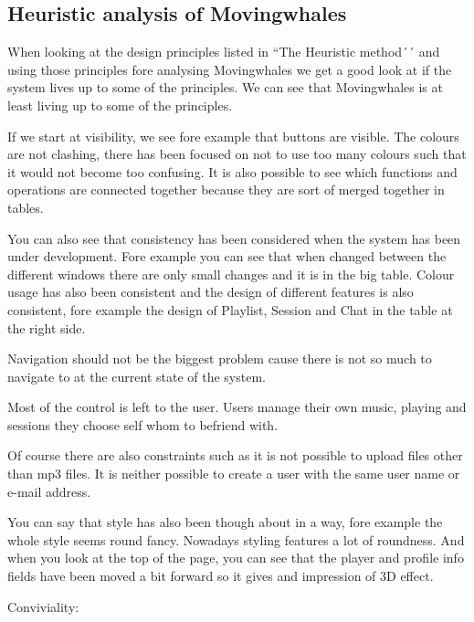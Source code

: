 \subsection{Heuristic analysis of Movingwhales}

When looking at the design principles listed in ``The Heuristic method´´ and using those principles fore analysing Movingwhales we get a good look at if the system lives up to some of the principles. We can see that Movingwhales is at least living up to some of the principles.

If we start at visibility, we see fore example that buttons are visible. The colours are not clashing, there has been focused on not to use too many colours such that it would not become too confusing. It is also possible to see which functions and operations are connected together because they are sort of merged together in tables.

You can also see that consistency has been considered when the system has been under development. Fore example you can see that when changed between the different windows there are only small changes and it is in the big table. Colour usage has also been consistent and the design of different features  is also consistent, fore example the design of Playlist, Session and Chat in the table at the right side.

Navigation should not be the biggest problem cause there is not so much to navigate to at the current state of the system.

Most of the control is left to the user. Users manage their own music, playing and sessions they choose self whom to befriend with.

Of course there are also constraints such as it is not possible to upload files other than mp3 files. It is neither possible to create a user with the same user name or e-mail address.

You can say that style has also been though about in a way, fore example the whole style seems round fancy. Nowadays styling features a lot of roundness. And when you look at the top of the page, you can see that the player and profile info fields have been moved a bit forward so it gives and impression of 3D effect.

Conviviality: